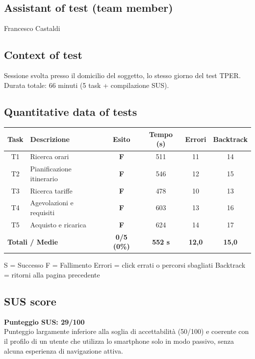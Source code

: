 ﻿\documentclass[11pt,a4paper]{article}
\begin{document}
\subsection*{Assistant of test (team member)}
\begin{tcolorbox}[base]
Francesco Castaldi
\end{tcolorbox}

\subsection*{Context of test}
\begin{tcolorbox}[base]
Sessione svolta presso il domicilio del soggetto, lo stesso giorno del test TPER. Durata totale: 66 minuti (5 task + compilazione SUS).
\end{tcolorbox}

\subsection*{Quantitative data of tests}
\begin{tcolorbox}[base]
\begin{center}
\renewcommand{\arraystretch}{1.4}
\begin{tabular}{clcccc}
\toprule
\textbf{Task} & \textbf{Descrizione} &
\textbf{Esito} & \textbf{Tempo (s)} &
\textbf{Errori} & \textbf{Backtrack} \\
\midrule
T1 & Ricerca orari             & \textbf{F} & 511 & 11 & 14 \\
T2 & Pianificazione itinerario & \textbf{F} & 546 & 12 & 15 \\
T3 & Ricerca tariffe           & \textbf{F} & 478 & 10 & 13 \\
T4 & Agevolazioni e requisiti  & \textbf{F} & 603 & 13 & 16 \\
T5 & Acquisto e ricarica       & \textbf{F} & 624 & 14 & 17 \\
\midrule
\multicolumn{2}{l}{\textbf{Totali / Medie}} &
\textbf{0/5 (0\%)} & \textbf{552 s} &
\textbf{12,0} & \textbf{15,0} \\
\bottomrule
\end{tabular}
\end{center}
\vspace{0.3cm}
\small S = Successo \quad F = Fallimento \quad Errori = click errati o percorsi sbagliati \quad Backtrack = ritorni alla pagina precedente
\end{tcolorbox}

\subsection*{SUS score}
\begin{tcolorbox}[base]
\textbf{Punteggio SUS: 29/100}\\[0.2cm]
\small Punteggio largamente inferiore alla soglia di accettabilità (50/100) e coerente con il profilo di un utente che utilizza lo smartphone solo in modo passivo, senza alcuna esperienza di navigazione attiva.
\end{tcolorbox}
\end{document}
